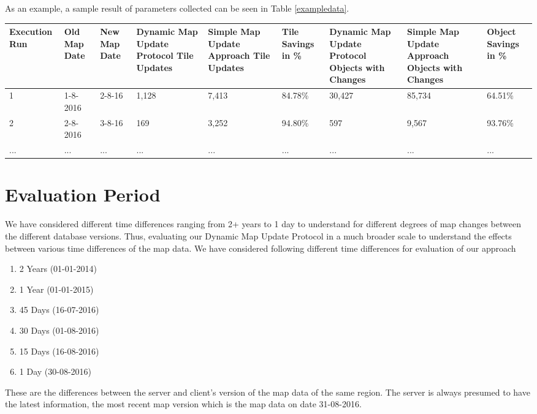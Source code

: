 As an example, a sample result of parameters collected can be seen in Table \ref{exampledata}.  

\begin{table*}
\caption{A sample excerpt of the evaluation parameters obtained in the evaluation. Some additional parameters were also collected, but not shown in this example}
\begin{small}
\centering
\begin{tabular}
{p{1.3cm}p{1.3cm}p{1.3cm}p{1.3cm}p{1.3cm}p{1.3cm}p{1.3cm}p{1.3cm}p{1.3cm}}
Execution Run&	Old Map Date & New Map Date & Dynamic Map Update Protocol Tile Updates & Simple Map Update Approach Tile Updates & Tile Savings in \% & Dynamic Map Update Protocol Objects with Changes & Simple Map Update Approach Objects with Changes & Object Savings in \% \\ 
\hline 
1&	1-8-2016&	2-8-16&	1,128&	7,413&		84.78\%&	30,427&	85,734&	64.51\% \\ 
\hline 
2&	2-8-2016&	3-8-16&	169&	3,252&		94.80\%&	597&	9,567&	93.76\% \\
\hline
 ... & ... & ... & ... & ... & ... & ... & ... & ... \\ 
\end{tabular}
\end{small}
\label{exampledata}
\end{table*}



\section{Evaluation Period} \label{timedifference}
We have considered different time differences ranging from 2+ years to 1 day to understand for different degrees of map changes between the different database versions. Thus, evaluating our Dynamic Map Update Protocol in a much broader scale to understand the effects between various time differences of the map data. We have considered following different time differences for evaluation of our approach \begin{enumerate}
\item 2 Years (01-01-2014)
\item 1 Year (01-01-2015)
\item 45 Days (16-07-2016)
\item 30 Days (01-08-2016)
\item 15 Days (16-08-2016)
\item 1 Day (30-08-2016)
\end{enumerate}
These are the differences between the server and client's version of the map data of the same region. The server is always presumed to have the latest information, the most recent map version which is the map data on date 31-08-2016. 
\\

